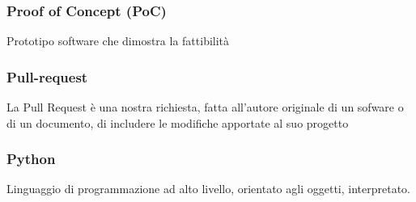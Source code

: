 \subsubsection*{Proof of Concept (PoC)}
Prototipo software che dimostra la fattibilità 
\subsubsection*{Pull-request}
La Pull Request è una nostra richiesta, fatta all’autore originale di un sofware o di un documento, di includere le modifiche apportate al suo progetto
\subsubsection*{Python}
Linguaggio di programmazione ad alto livello, orientato agli oggetti, interpretato.
